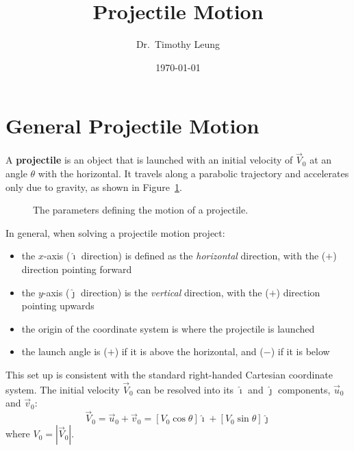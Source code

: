 \documentclass{../../oss-handout}
\title{Projectile Motion}
\author{Dr.\ Timothy Leung}
\date{\today}
\newcommand{\iii}{\hat\imath}
\newcommand{\jjj}{\hat\jmath}
\begin{document}
\thispagestyle{title}
\gentitle

\section{General Projectile Motion}
A \textbf{projectile} is an object that is launched with an initial velocity
of $\vec V_0$ at an angle $\theta$ with the horizontal. It travels along a
parabolic trajectory and accelerates only due to gravity, as shown in
Figure~\ref{fig:projectile}. 
\begin{figure}[ht]
  \centering
  \caption{The parameters defining the motion of a projectile.}
  \label{fig:projectile}
\end{figure}

In general, when solving a projectile motion project:
\begin{itemize}[nosep]
\item the $x$-axis ($\iii$ direction) is defined as the \emph{horizontal}
  direction, with the ($+$) direction pointing forward
\item the $y$-axis ($\jjj$ direction) is the \emph{vertical} direction, with
  the ($+$) direction pointing upwards
\item the origin of the coordinate system is where the projectile is launched
\item the launch angle is ($+$) if it is above the horizontal, and ($-$) if it
  is below
\end{itemize}
This set up is consistent with the standard right-handed Cartesian coordinate
system. The initial velocity $\vec V_0$ can be resolved into its $\iii$ and
$\jjj$ components, $\vec u_0$ and $\vec v_0$:
\begin{equation}
  \vec V_0 =\vec u_0+\vec v_0
  =\left[V_0\cos\theta\right]\iii + \left[V_0\sin\theta\right]\jjj
\end{equation}
where $V_0=|\vec V_0|$.
\end{document}
